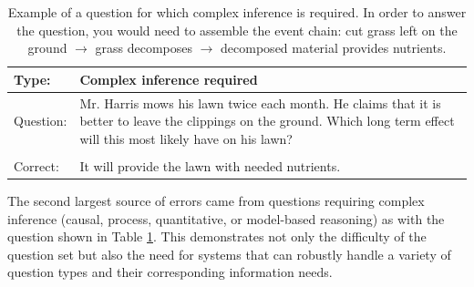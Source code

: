\begin{table}[!th]
\begin{center}
\begin{tabular}{p{2cm}p{12cm}}
\hline
Type: & \textbf{Complex inference required}\\
\hline
Question: & Mr. Harris mows his lawn twice each month. He claims that it is better to leave the clippings on the ground. Which long term effect will this most likely have on his lawn? \\
\\
Correct: &  It will provide the lawn with needed nutrients. \\	
\end{tabular}
\caption{{ Example of a question for which complex inference is required.  In order to answer the question, you would need to assemble the event chain: cut grass left on the ground $\rightarrow$ grass decomposes $\rightarrow$ decomposed material provides nutrients.}} 
\label{tab:ex_complex_inf}
\end{center}
\end{table}

The second largest source of errors came from questions requiring complex inference (causal, process, quantitative, or model-based  reasoning) as with the question shown in Table \ref{tab:ex_complex_inf}.  This demonstrates not only the difficulty of the question set but also the need for systems that can robustly handle a variety of question types and their corresponding information needs.  



